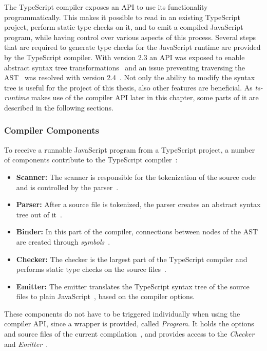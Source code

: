 The TypeScript compiler exposes an API to use its functionality programmatically. This makes it possible to read in an existing TypeScript project, perform static type checks on it, and to emit a compiled JavaScript program, while having control over various aspects of this process. Several steps that are required to generate type checks for the JavaScript runtime are provided by the TypeScript compiler. With version 2.3 an API was exposed to enable abstract syntax tree transformations~\cite{TypeScriptPullRequest:Transformation} and an issue preventing traversing the AST~\cite{TypeScriptIssue:Visitors} was resolved with version 2.4~\cite{TypeScriptPullRequest:Visitors}. Not only the ability to modify the syntax tree is useful for the project of this thesis, also other features are beneficial. As \emph{ts-runtime} makes use of the compiler API later in this chapter, some parts of it are described in the following sections.

\subsubsection{Compiler Components}

To receive a runnable JavaScript program from a TypeScript project, a number of components contribute to the TypeScript compiler~\cite[p.~251]{TypeScriptBook:Syed:2017}:
\begin{itemize}
  \item \textbf{Scanner:} The scanner is responsible for the tokenization of the source code and is controlled by the parser~\cite[p.~260]{TypeScriptBook:Syed:2017}.
  \item \textbf{Parser:} After a source file is tokenized, the parser creates an abstract syntax tree out of it~\cite[p.~263]{TypeScriptBook:Syed:2017}.
  \item \textbf{Binder:} In this part of the compiler, connections between nodes of the AST are created through \emph{symbols}~\cite[p.~267]{TypeScriptBook:Syed:2017}.
  \item \textbf{Checker:} The checker is the largest part of the TypeScript compiler and performs static type checks on the source files~\cite[p.~282]{TypeScriptBook:Syed:2017}.
  \item \textbf{Emitter:} The emitter translates the TypeScript syntax tree of the source files to plain JavaScript~\cite[p.~286]{TypeScriptBook:Syed:2017}, based on the compiler options.
\end{itemize}
These components do not have to be triggered individually when using the compiler API, since a wrapper is provided, called \emph{Program}. It holds the options and source files of the current compilation~\cite[p.~254]{TypeScriptBook:Syed:2017}, and provides access to the \emph{Checker}~\cite[p.~282]{TypeScriptBook:Syed:2017} and \emph{Emitter}~\cite[p.~286]{TypeScriptBook:Syed:2017}.

